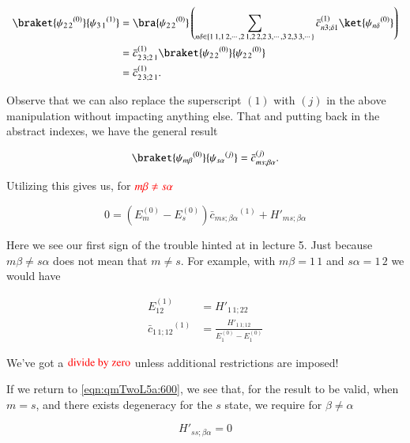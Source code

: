 \begin{align*}
\braket{{\psi_{2\,2}}^{(0)}}{{\psi_{3\,1}}^{(1)}} 
&=
\bra{{\psi_{2\,2}}^{(0)}}
\left(
\sum_{n \delta \in \{1\,1, 1\,2, \cdots, 2\,1, 2\,2, 2\,3, \cdots, 3\,2, 3\,3, \cdots \} } {\bar{c}_{n 3; \delta 1}}^{(1)} \ket{{\psi_{n \delta}}^{(0)}}
\right) \\
&=
{\bar{c}_{2\,3 ; 2\,1}}^{(1)} \braket{{\psi_{2\,2}}^{(0)}}{{\psi_{2\,2}}^{(0)}} \\
&=
{\bar{c}_{2\,3; 2\,1}}^{(1)}.
\end{align*}

Observe that we can also replace the superscript $(1)$ with $(j)$ in the above manipulation without impacting anything else.  That and putting back in the abstract indexes, we have the general result

\begin{equation}\label{eqn:qmTwoL5a:580}
\braket{{\psi_{m \beta}}^{(0)}}{{\psi_{s \alpha}}^{(j)}} 
=
{\bar{c}_{ms ; \beta \alpha}}^{(j)}.
\end{equation}

Utilizing this gives us, for $\color{red}{m \beta \ne s \alpha}$

\begin{equation}\label{eqn:qmTwoL5a:600}
0 = 
( E_m^{(0)} - E_s^{(0)}) 
{\bar{c}_{ms ; \beta \alpha}}^{(1)}
+
{H'}_{ms ; \beta \alpha} 
\end{equation}

Here we see our first sign of the trouble hinted at in lecture 5.  Just because $m \beta \ne s \alpha$ does not mean that $m \ne s$.  For example, with $m \beta = 1\,1$ and $s\alpha = 1\,2$ we would have

\begin{align}\label{eqn:qmTwoL5a:620a}
E_{1 2}^{(1)} &= {H'}_{1\,1 ; 2 2} \\
{\bar{c}_{1\,1 ; 1 2}}^{(1)}
&=
\frac{{H'}_{1\,1 ; 1 2} }
{ E_1^{(0)} - E_1^{(0)} }
\end{align}

We've got a $\color{red}{\text{divide by zero}}$ unless additional restrictions are imposed!

If we return to \ref{eqn:qmTwoL5a:600}, we see that, for the result to be valid, when $m = s$, and there exists degeneracy for the $s$ state, we require for $\beta \ne \alpha$

\begin{equation}\label{eqn:qmTwoL5a:610}
{H'}_{ss ; \beta \alpha} = 0
\end{equation}

